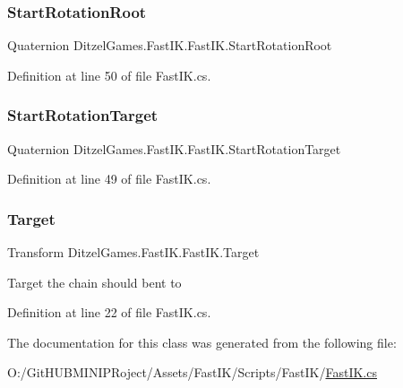 \mbox{\label{class_ditzel_games_1_1_fast_i_k_1_1_fast_i_k_a95f5d9b28b12e95d86a0cb78411d49e1}} 
\subsubsection{\texorpdfstring{StartRotationRoot}{StartRotationRoot}}
{\footnotesize\ttfamily Quaternion Ditzel\+Games.\+Fast\+I\+K.\+Fast\+I\+K.\+Start\+Rotation\+Root\hspace{0.3cm}{\ttfamily [protected]}}



Definition at line 50 of file Fast\+I\+K.\+cs.

\mbox{\label{class_ditzel_games_1_1_fast_i_k_1_1_fast_i_k_a9b58bd4e05eec6ab27ca4b38ef97b8ee}} 
\subsubsection{\texorpdfstring{StartRotationTarget}{StartRotationTarget}}
{\footnotesize\ttfamily Quaternion Ditzel\+Games.\+Fast\+I\+K.\+Fast\+I\+K.\+Start\+Rotation\+Target\hspace{0.3cm}{\ttfamily [protected]}}



Definition at line 49 of file Fast\+I\+K.\+cs.

\mbox{\label{class_ditzel_games_1_1_fast_i_k_1_1_fast_i_k_acc174a0910d921eb1a14fb857cef9341}} 
\subsubsection{\texorpdfstring{Target}{Target}}
{\footnotesize\ttfamily Transform Ditzel\+Games.\+Fast\+I\+K.\+Fast\+I\+K.\+Target}



Target the chain should bent to 



Definition at line 22 of file Fast\+I\+K.\+cs.



The documentation for this class was generated from the following file\+:\begin{DoxyCompactItemize}
\item 
O\+:/\+Git\+H\+U\+B\+M\+I\+N\+I\+P\+Roject/\+Assets/\+Fast\+I\+K/\+Scripts/\+Fast\+I\+K/\mbox{\hyperlink{_fast_i_k_8cs}{Fast\+I\+K.\+cs}}\end{DoxyCompactItemize}
